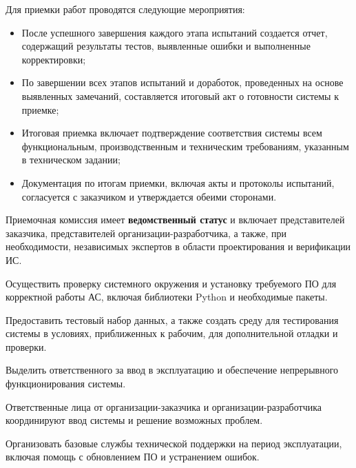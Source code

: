 Для приемки работ проводятся следующие мероприятия:

\begin{itemize}
	\item После успешного завершения каждого этапа испытаний создается отчет,
	содержащий результаты тестов,
	выявленные ошибки и выполненные корректировки;
	\item По завершении всех этапов испытаний и доработок,
	проведенных на основе выявленных замечаний,
	составляется итоговый акт о готовности системы к приемке;
	\item Итоговая приемка включает подтверждение соответствия системы
	всем функциональным, производственным и техническим требованиям,
	указанным в техническом задании;
	\item Документация по итогам приемки, включая акты и протоколы испытаний,
	согласуется с заказчиком и утверждается обеими сторонами.
\end{itemize}


Приемочная комиссия имеет \textbf{ведомственный статус}
и включает представителей заказчика,
представителей организации-разработчика, а также, при необходимости,
независимых экспертов в области проектирования и верификации ИС.



Осуществить проверку системного окружения
и установку требуемого ПО для корректной работы АС,
включая библиотеки Python и необходимые пакеты.

Предоставить тестовый набор данных,
а также создать среду для тестирования системы в условиях,
приближенных к рабочим, для дополнительной отладки и проверки.


Выделить ответственного за ввод в эксплуатацию
и обеспечение непрерывного функционирования системы.

Ответственные лица от организации-заказчика
и организации-разработчика координируют ввод системы
и решение возможных проблем.

Организовать базовые службы технической поддержки на период эксплуатации,
включая помощь с обновлением ПО и устранением ошибок.

